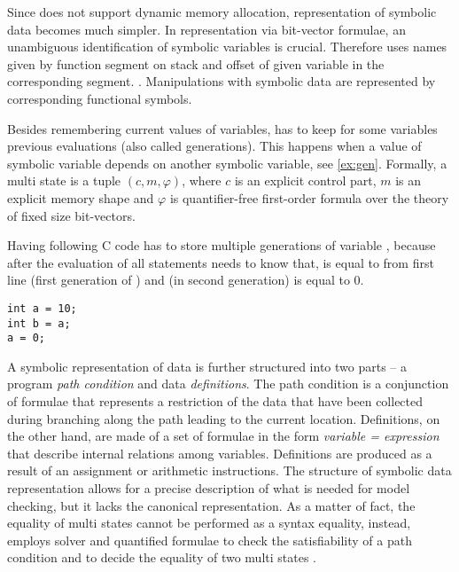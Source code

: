 Since \SymDIVINE does not support dynamic memory allocation, representation
of symbolic data becomes much simpler. In representation via bit-vector
\SMT formulae, an unambiguous identification of symbolic variables is crucial.
Therefore \SymDIVINE uses names given by function
segment on stack and offset of given variable in the corresponding segment. \cite{Mrazek16}.
Manipulations with symbolic data are represented by corresponding functional symbols.

Besides remembering current values of variables, \SymDIVINE has to keep for
some variables previous evaluations (also called generations). This happens when
a value of symbolic variable depends on another symbolic variable, see \autoref{ex:gen}. Formally,
a multi state is a tuple $(c, m, \varphi)$, where $c$ is an explicit control part, $m$ is an
explicit memory shape and $\varphi$ is quantifier-free first-order formula over the theory of fixed size
bit-vectors.


\begin{example}\label{ex:gen}
Having following C code \SymDIVINE has to store multiple generations of variable
, because after the evaluation of all statements \SymDIVINE needs to know
that,  is equal to  from first line (first generation of
) and  (in second generation) is equal to $0$.

\begin{verbatim}
int a = 10;
int b = a;
a = 0;
\end{verbatim}

\end{example}

A symbolic representation of data is further structured into two parts -- a
program \emph{path condition} and data \emph{definitions}. The path condition is a
conjunction of formulae that represents a restriction of the data that have been
collected during branching along the path leading to the current location.
Definitions, on the other hand, are made of a set of formulae in the form
\emph{variable = expression} that describe internal relations among variables.
Definitions are produced as a result of an assignment or arithmetic
instructions. The structure of symbolic data representation allows for a
precise description of what is needed for model checking, but it lacks the
canonical representation. As a matter of fact, the equality of multi states
cannot be performed as a syntax equality, instead, \SymDIVINE employs \SMT
solver and quantified formulae to check the satisfiability of a path condition
and to decide the equality of two multi states \cite{Mrazek16}.

